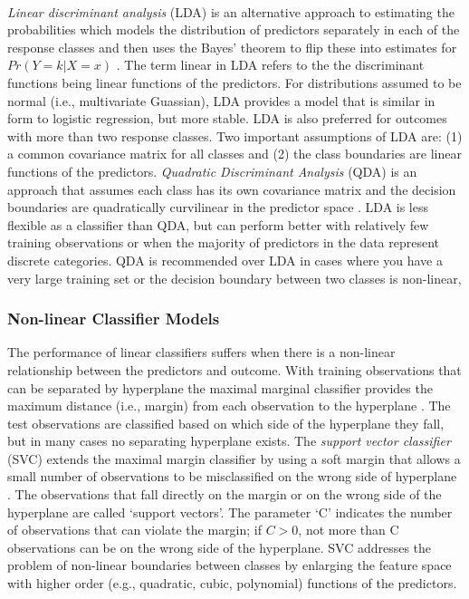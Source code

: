 \\\documentclass[sigconf]{acmart}
\begin{document}
\emph{Linear discriminant analysis} (LDA) is an alternative approach to 
estimating the probabilities which models the distribution of predictors 
separately in each of the response classes and then uses the Bayes' theorem 
to flip these into estimates for $Pr(Y=k | X=x)$ \cite{james13}. The term 
linear in LDA refers to the the discriminant functions being linear functions 
of the predictors. For distributions assumed to be normal (i.e., multivariate 
Guassian), LDA provides a model that is similar in form to logistic regression, 
but more stable. LDA is also preferred for outcomes with more than two response 
classes. Two important assumptions of LDA are: (1) a common covariance matrix 
for all classes and (2) the class boundaries are linear functions of the 
predictors. \emph{Quadratic Discriminant Analysis} (QDA) is an approach that 
assumes each class has its own covariance matrix and the decision boundaries 
are quadratically curvilinear in the predictor space \cite{kuhn13}. LDA is less 
flexible as a classifier than QDA, but can perform better with relatively few 
training observations or when the majority of predictors in the data represent 
discrete categories. QDA is recommended over LDA in cases where you have a 
very large training set or the decision boundary between two classes is 
non-linear, 


\subsubsection{Non-linear Classifier Models}

The performance of linear classifiers suffers when there is a non-linear 
relationship between the predictors and outcome. With training observations 
that can be separated by hyperplane the maximal marginal classifier provides 
the maximum distance (i.e., margin) from each observation to the hyperplane 
\cite{james13}. The test observations are classified based on which side of 
the hyperplane they fall, but in many cases no separating hyperplane exists. 
The \emph{support vector classifier} (SVC) extends the maximal margin 
classifier by using a soft margin that allows a small number of observations 
to be misclassified on the wrong side of hyperplane \cite{kuhn13, cortes95}. 
The observations that fall directly on the margin or on the wrong side of the 
hyperplane are called `support vectors'. The parameter `C' indicates the number 
of observations that can violate the margin; if $C>0$, not more than C 
observations can be on the wrong side of the hyperplane. SVC addresses the 
problem of non-linear boundaries between classes by enlarging the feature 
space with higher order (e.g., quadratic, cubic, polynomial) functions of 
the predictors. 
\end{document}
